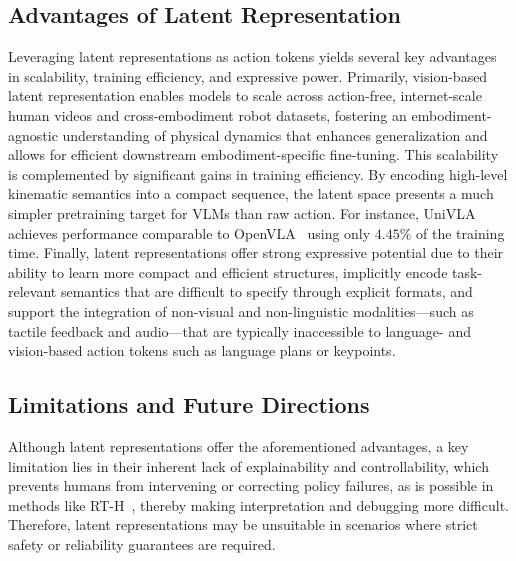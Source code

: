 \documentclass[10pt, a4paper, logo, copyright]{googledeepmind} %
\begin{document}
\subsection{Advantages of Latent Representation}
Leveraging latent representations as action tokens yields several key advantages in scalability, training efficiency, and expressive power.
Primarily, vision-based latent representation enables models to scale across action-free, internet-scale human videos and cross-embodiment robot datasets, fostering an embodiment-agnostic understanding of physical dynamics that enhances generalization and allows for efficient downstream embodiment-specific fine-tuning. 
This scalability is complemented by significant gains in training efficiency. By encoding high-level kinematic semantics into a compact sequence, the latent space presents a much simpler pretraining target for VLMs than raw action. For instance, UniVLA achieves performance comparable to OpenVLA~\cite{kim2024openvla} using only $4.45\%$ of the training time.
Finally, latent representations offer strong expressive potential due to their ability to learn more compact and efficient structures, implicitly encode task-relevant semantics that are difficult to specify through explicit formats, and support the integration of non-visual and non-linguistic modalities—such as tactile feedback and audio—that are typically inaccessible to language- and vision-based action tokens such as language plans or keypoints.



\subsection{Limitations and Future Directions}
Although latent representations offer the aforementioned advantages, a key limitation lies in their inherent lack of explainability and controllability, which prevents humans from intervening or correcting policy failures, as is possible in methods like RT-H~\cite{rth2024arxiv}, thereby making interpretation and debugging more difficult. Therefore, latent representations may be unsuitable in scenarios where strict safety or reliability guarantees are required. 
\end{document}
